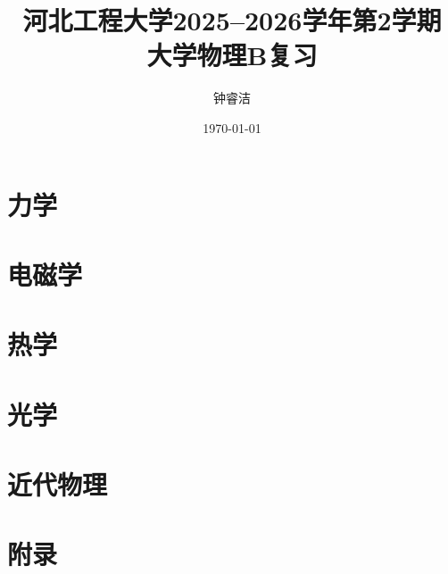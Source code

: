 \documentclass[AutoFakeBold,12pt,UTF8]{ctexbook}
\title{河北工程大学2025--2026学年第2学期\\大学物理B复习}
\author{钟睿洁}
\date{\today}
\begin{document}


\part{力学}








\part{电磁学}




\part{热学}



\part{光学}


\part{近代物理}






\appendix
\part{附录}

\end{document}

